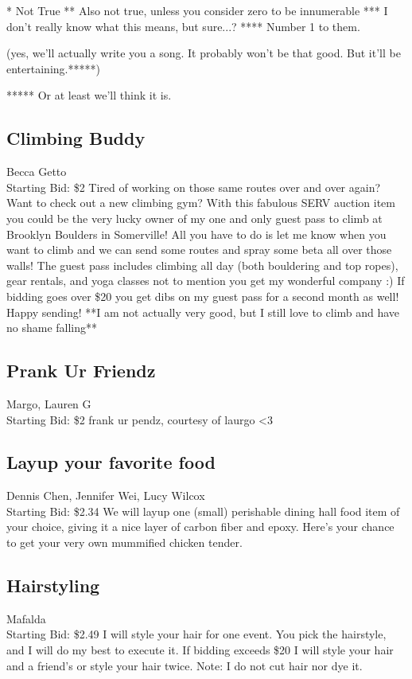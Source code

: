 \documentclass[11pt]{article}
\begin{document}
* Not True
** Also not true, unless you consider zero to be innumerable
*** I don't really know what this means, but sure...?
**** Number 1 to them.

(yes, we'll actually write you a song. It probably won't be that good. But it'll be entertaining.*****)

***** Or at least we'll think it is.
\subsection{Climbing Buddy}
Becca Getto
\\
Starting Bid: \$2
\newline
Tired of working on those same routes over and over again? Want to check out a new climbing gym? With this fabulous SERV auction item you could be the very lucky owner of my one and only guest pass to climb at Brooklyn Boulders in Somerville! All you have to do is let me know when you want to climb and we can send some routes and spray some beta all over those walls! The guest pass includes climbing all day (both bouldering and top ropes), gear rentals, and yoga classes not to mention you get my wonderful company :) If bidding goes over \$20 you get dibs on my guest pass for a second month as well! Happy sending! **I am not actually very good, but I still love to climb and have no shame falling**
\subsection{Prank Ur Friendz}
Margo, Lauren G
\\
Starting Bid: \$2
\newline
frank ur pendz, courtesy of laurgo \textless 3
\subsection{Layup your favorite food}
Dennis Chen, Jennifer Wei, Lucy Wilcox
\\
Starting Bid: \$2.34
\newline
We will layup one (small) perishable dining hall food item of your choice, giving it a nice layer of carbon fiber and epoxy. Here's your chance to get your very own mummified chicken tender.
\subsection{Hairstyling}
Mafalda
\\
Starting Bid: \$2.49
\newline
I will style your hair for one event. You pick the hairstyle, and I will do my best to execute it. If bidding exceeds \$20 I will style your hair and a friend's or style your hair twice.  Note: I do not cut hair nor dye it.
\end{document}
